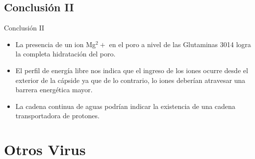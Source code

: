 \documentclass[8pt]{beamer}
\begin{document}
\subsection{Conclusión II}
\begin{frame}{Conclusión II}
\begin{itemize}
    \item La presencia de un ion Mg$^2+$ en el poro a nivel de las Glutaminas 3014 logra la completa hidratación del poro.\vfill
    \item El perfil de energía libre nos indica que el ingreso de los iones ocurre desde el exterior de la cápside ya que de lo contrario, lo iones deberían atravesar una barrera energética mayor.\vfill
    \item La cadena continua de aguas podrían indicar la existencia de una cadena transportadora de protones.
\end{itemize}
\end{frame}

%
%

\section{Otros Virus}
\end{document}
